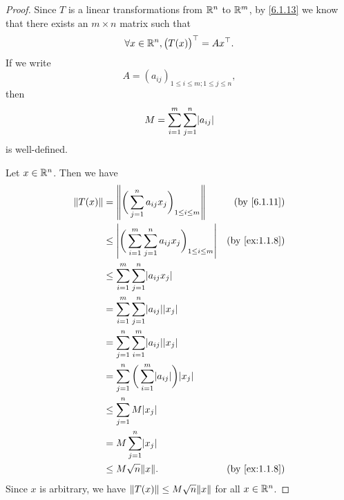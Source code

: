 \begin{proof}
  Since \(T\) is a linear transformations from \(\mathbb{R}^n\) to \(\mathbb{R}^m\), by \cref{6.1.13} we know that there exists an \(m \times n\) matrix such that
  \[
    \forall x \in \mathbb{R}^n, \big(T(x)\big)^\top = Ax^\top.
  \]
  If we write
  \[
    A = (a_{ij})_{1 \leq i \leq m ; 1 \leq j \leq n},
  \]
  then
  \[
    M = \sum_{i = 1}^m \sum_{j = 1}^n \abs{a_{ij}}
  \]
  is well-defined.

  Let \(x \in \mathbb{R}^n\).
  Then we have
  \begin{align*}
    \norm*{T(x)} & = \norm*{\bigg(\sum_{j = 1}^n a_{ij} x_j\bigg)_{1 \leq i \leq m}}                 & \text{(by \cref{6.1.11})}   \\
                 & \leq \abs{\bigg(\sum_{i = 1}^m \sum_{j = 1}^n a_{ij} x_j\bigg)_{1 \leq i \leq m}} & \text{(by \cref{ex:1.1.8})} \\
                 & \leq \sum_{i = 1}^m \sum_{j = 1}^n \abs{a_{ij} x_j}                                                             \\
                 & = \sum_{i = 1}^m \sum_{j = 1}^n \abs{a_{ij}} \abs{x_j}                                                          \\
                 & = \sum_{j = 1}^n \sum_{i = 1}^m \abs{a_{ij}} \abs{x_j}                                                          \\
                 & = \sum_{j = 1}^n \bigg(\sum_{i = 1}^m \abs{a_{ij}}\bigg) \abs{x_j}                                              \\
                 & \leq \sum_{j = 1}^n M \abs{x_j}                                                                                 \\
                 & = M \sum_{j = 1}^n \abs{x_j}                                                                                    \\
                 & \leq M \sqrt{n} \norm*{x}.                                                        & \text{(by \cref{ex:1.1.8})}
  \end{align*}
  Since \(x\) is arbitrary, we have \(\norm*{T(x)} \leq M \sqrt{n} \norm*{x}\) for all \(x \in \mathbb{R}^n\).


\end{proof}
